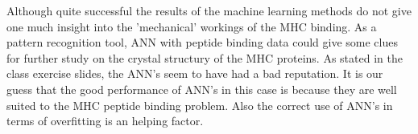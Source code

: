Although quite successful the results of the machine learning methods do not give one much insight into the 'mechanical' workings of the MHC binding.
As a pattern recognition tool, ANN with peptide binding data could give some clues for further study on the crystal structury of the MHC proteins.
As stated in the class exercise slides, the ANN's seem to have had a bad reputation. 
It is our guess that the good performance of ANN's in this case is because they are well suited to the MHC peptide binding problem. 
Also the correct use of ANN's in terms of overfitting is an helping factor.

